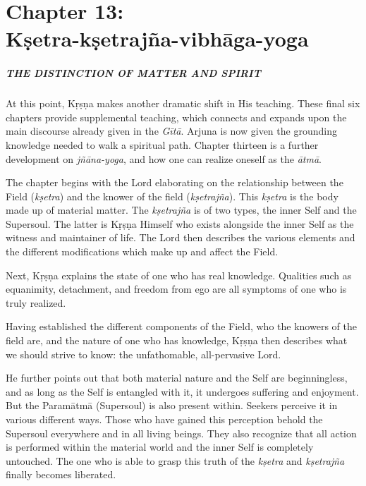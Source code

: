 \chapter{Chapter 13: \\Kṣetra-kṣetrajña-vibhāga-yoga}\label{chap-ksetra-ksetrajna-vibhaga-yoga}

\paragraph*{\MakeUppercase{The Distinction of Matter and Spirit}}

\noindent At this point, Kṛṣṇa makes another dramatic shift in His teaching. These final six chapters provide supplemental teaching, which connects and expands upon the main discourse already given in the \textit{Gītā}. Arjuna is now given the grounding knowledge needed to walk a spiritual path. Chapter thirteen is a further development on \textit{jñāna-yoga}, and how one can realize oneself as the \textit{ātmā}.

The chapter begins with the Lord elaborating on the relationship between the Field (\textit{kṣetra}) and the knower of the field (\textit{kṣetrajña}). This \textit{kṣetra} is the body made up of material matter. The \textit{kṣetrajña} is of two types, the inner Self and the Supersoul. The latter is Kṛṣṇa Himself who exists alongside the inner Self as the witness and maintainer of life. The Lord then describes the various elements and the different modifications which make up and affect the Field.

Next, Kṛṣṇa explains the state of one who has real knowledge. Qualities such as equanimity, detachment, and freedom from ego are all symptoms of one who is truly realized.

Having established the different components of the Field, who the knowers of the field are, and the nature of one who has knowledge, Kṛṣṇa then describes what we should strive to know: the unfathomable, all-pervasive Lord.

He further points out that both material nature and the Self are beginningless, and as long as the Self is entangled with it, it undergoes suffering and enjoyment. But the Paramātmā (Supersoul) is also present within. Seekers perceive it in various different ways. Those who have gained this perception behold the Supersoul everywhere and in all living beings. They also recognize that all action is performed within the material world and the inner Self is completely untouched. The one who is able to grasp this truth of the \textit{kṣetra} and \textit{kṣetrajña} finally becomes liberated.

